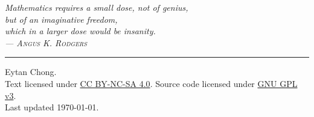 \begin{titlepage}
    \vspace*{\fill}

    \begin{flushright}
		\large\itshape
        Mathematics requires a small dose, not of genius,\\[0.4cm]
        but of an imaginative freedom,\\[0.4cm]
        which in a larger dose would be insanity.\\[0.8cm]
		--- \textsc{Angus K. Rodgers}
	\end{flushright}
    
    \vspace*{\fill}
    \hrule
    \medbreak
    {\small
    \noindent {\copyright} {\the\year} Eytan Chong.\\
    \noindent Text licensed under \href{https://creativecommons.org/licenses/by-nc-sa/4.0/}{CC BY-NC-SA 4.0}. Source code licensed under \href{https://www.gnu.org/licenses/gpl-3.0-standalone.html}{GNU GPL v3}.\\[0.4cm]
    \noindent Last updated \today.
    }
\end{titlepage}